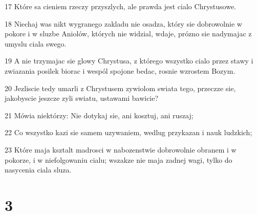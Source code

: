 \par 17 Które sa cieniem rzeczy przyszlych, ale prawda jest cialo Chrystusowe.
\par 18 Niechaj was nikt wygranego zakladu nie osadza, który sie dobrowolnie w pokore i w sluzbe Aniolów, których nie widzial, wdaje, prózno sie nadymajac z umyslu ciala swego.
\par 19 A nie trzymajac sie glowy Chrystusa, z którego wszystko cialo przez stawy i zwiazania posilek biorac i wespól spojone bedac, rosnie wzrostem Bozym.
\par 20 Jezliscie tedy umarli z Chrystusem zywiolom swiata tego, przeczze sie, jakobyscie jeszcze zyli swiatu, ustawami bawicie?
\par 21 Mówia niektórzy: Nie dotykaj sie, ani kosztuj, ani ruszaj;
\par 22 Co wszystko kazi sie samem uzywaniem, wedlug przykazan i nauk ludzkich;
\par 23 Które maja ksztalt madrosci w nabozenstwie dobrowolnie obranem i w pokorze, i w niefolgowaniu cialu; wszakze nie maja zadnej wagi, tylko do nasycenia ciala sluza.

\chapter{3}

